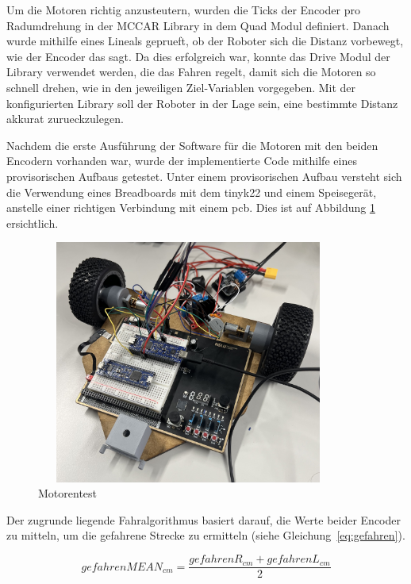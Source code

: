 Um die Motoren richtig anzusteutern, wurden die Ticks der Encoder pro Radumdrehung in der MCCAR Library in dem Quad Modul definiert. Danach wurde mithilfe eines Lineals geprueft, ob der Roboter sich die Distanz vorbewegt, wie der Encoder das sagt. Da dies erfolgreich war, konnte das Drive Modul der Library verwendet werden, die das Fahren regelt, damit sich die Motoren so schnell drehen, wie in den jeweiligen Ziel-Variablen vorgegeben. Mit der konfigurierten Library soll der Roboter in der Lage sein, eine bestimmte Distanz akkurat zurueckzulegen.

Nachdem die erste Ausführung der Software für die Motoren mit den beiden Encodern vorhanden war, wurde der implementierte Code mithilfe eines provisorischen Aufbaus getestet. Unter einem provisorischen Aufbau versteht sich die Verwendung eines Breadboards mit dem \gls{tinyk22} und einem Speisegerät, anstelle einer richtigen Verbindung mit einem \acrshort{pcb}. Dies ist auf Abbildung \ref{fig: Motorentest} ersichtlich.

\begin{figure}[H]
\centering
\includegraphics[width=10cm, height=8cm]{assets/ET/Motoren/Motorentest.jpeg}
\caption{Motorentest}
\label{fig: Motorentest}
\end{figure}

Der zugrunde liegende Fahralgorithmus basiert darauf, die Werte beider Encoder zu mitteln, um die gefahrene Strecke zu ermitteln (siehe Gleichung~\ref{eq:gefahren}).

\begin{equation}
    gefahrenMEAN_{cm} = \frac{gefahrenR_{cm} + gefahrenL_{cm}} {2} 
    \label{eq:gefahren}
\end{equation}







